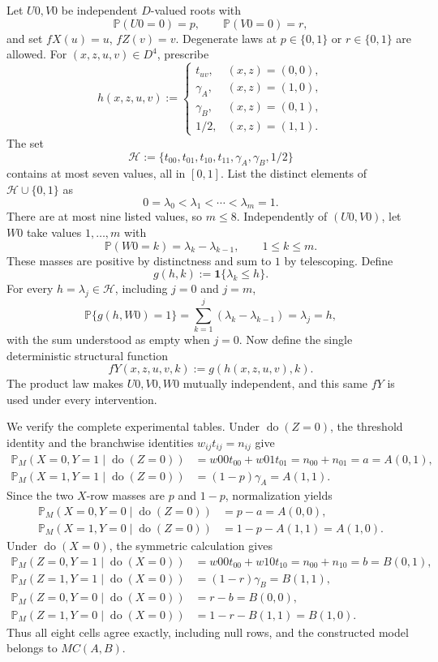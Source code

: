 Let \(U0,V0\) be independent \(D\)-valued roots with
\[
\mathbb P(U0=0)=p,
\qquad
\mathbb P(V0=0)=r,
\]
and set \(fX(u)=u\), \(fZ(v)=v\).  Degenerate laws at \(p\in\{0,1\}\) or \(r\in\{0,1\}\) are allowed.  For \((x,z,u,v)\in D^4\), prescribe
\[
h(x,z,u,v):=
\begin{cases}
t_{uv},&(x,z)=(0,0),\\
\gamma_A,&(x,z)=(1,0),\\
\gamma_B,&(x,z)=(0,1),\\
1/2,&(x,z)=(1,1).
\end{cases}
\]
The set
\[
\mathcal H:=\{t_{00},t_{01},t_{10},t_{11},\gamma_A,\gamma_B,1/2\}
\]
contains at most seven values, all in \([0,1]\).  List the distinct elements of \(\mathcal H\cup\{0,1\}\) as
\[
0=\lambda_0<\lambda_1<\cdots<\lambda_m=1.
\]
There are at most nine listed values, so \(m\le8\).  Independently of \((U0,V0)\), let \(W0\) take values \(1,\ldots,m\) with
\[
\mathbb P(W0=k)=\lambda_k-\lambda_{k-1},
\qquad 1\le k\le m.
\]
These masses are positive by distinctness and sum to \(1\) by telescoping.  Define
\[
g(h,k):=\mathbf 1\{\lambda_k\le h\}.
\]
For every \(h=\lambda_j\in\mathcal H\), including \(j=0\) and \(j=m\),
\[
\mathbb P\{g(h,W0)=1\}
=\sum_{k=1}^{j}(\lambda_k-\lambda_{k-1})
=\lambda_j=h,
\]
with the sum understood as empty when \(j=0\).  Now define the single deterministic structural function
\[
fY(x,z,u,v,k):=g(h(x,z,u,v),k).
\]
The product law makes \(U0,V0,W0\) mutually independent, and this same \(fY\) is used under every intervention.

We verify the complete experimental tables.  Under \(\operatorname{do}(Z=0)\), the threshold identity and the branchwise identities \(w_{ij}t_{ij}=n_{ij}\) give
\[
\begin{aligned}
\mathbb P_M(X=0,Y=1\mid\operatorname{do}(Z=0))
&=w00t_{00}+w01t_{01}=n_{00}+n_{01}=a=A(0,1),\\
\mathbb P_M(X=1,Y=1\mid\operatorname{do}(Z=0))
&=(1-p)\gamma_A=A(1,1).
\end{aligned}
\]
Since the two \(X\)-row masses are \(p\) and \(1-p\), normalization yields
\[
\begin{aligned}
\mathbb P_M(X=0,Y=0\mid\operatorname{do}(Z=0))&=p-a=A(0,0),\\
\mathbb P_M(X=1,Y=0\mid\operatorname{do}(Z=0))&=1-p-A(1,1)=A(1,0).
\end{aligned}
\]
Under \(\operatorname{do}(X=0)\), the symmetric calculation gives
\[
\begin{aligned}
\mathbb P_M(Z=0,Y=1\mid\operatorname{do}(X=0))
&=w00t_{00}+w10t_{10}=n_{00}+n_{10}=b=B(0,1),\\
\mathbb P_M(Z=1,Y=1\mid\operatorname{do}(X=0))
&=(1-r)\gamma_B=B(1,1),\\
\mathbb P_M(Z=0,Y=0\mid\operatorname{do}(X=0))&=r-b=B(0,0),\\
\mathbb P_M(Z=1,Y=0\mid\operatorname{do}(X=0))&=1-r-B(1,1)=B(1,0).
\end{aligned}
\]
Thus all eight cells agree exactly, including null rows, and the constructed model belongs to \(MC(A,B)\).

